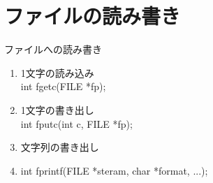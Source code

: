 \documentclass[a4paper]{jsarticle}
\begin{document}
\section{ファイルの読み書き}

\begin{itembox}[l]{ファイルへの読み書き}
    \begin{enumerate}[(1)]
        \item 1文字の読み込み\\
              int fgetc(FILE *fp);
        \item 1文字の書き出し\\
              int fputc(int c, FILE *fp);
        \item 文字列の書き出し\\
        \item int fprintf(FILE *steram, char *format, ...);
    \end{enumerate}
\end{itembox}
\end{document}
